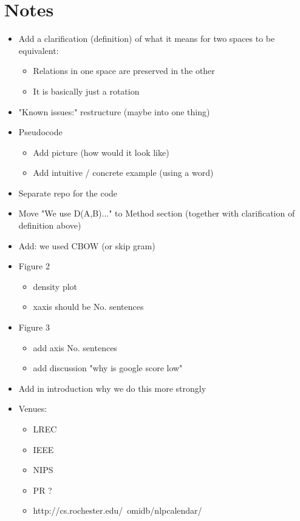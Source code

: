\documentclass{article} %
\begin{document}
\section{Notes}
\begin{itemize}
\item Add a clarification (definition) of what it means for two spaces to be equivalent:
  \begin{itemize}
  \item Relations in one space are preserved in the other
  \item It is basically just a rotation
  \end{itemize}
   
 \item "Known issues:" restructure (maybe into one thing)

 \item  Pseudocode 
 \begin{itemize}
  \item Add picture (how would it look like)
  \item Add intuitive / concrete example (using a word)
 \end{itemize}

 \item Separate repo for the code

 \item Move "We use D(A,B)..." to Method section (together with clarification of definition above)
 \item Add: we used CBOW (or skip gram)
 
 \item Figure 2 
 \begin{itemize}
  \item density plot
  \item xaxis should be No. sentences
 \end{itemize}

 \item Figure 3
  \begin{itemize}
  \item add axis No. sentences
  \item add discussion "why is google score low"
 \end{itemize}

 \item Add in introduction why we do this more strongly

 \item Venues:
 \begin{itemize}
  \item LREC
  \item IEEE
  \item NIPS
  \item PR ?
  \item http://cs.rochester.edu/~omidb/nlpcalendar/
 \end{itemize}

\end{itemize}



\end{document}
